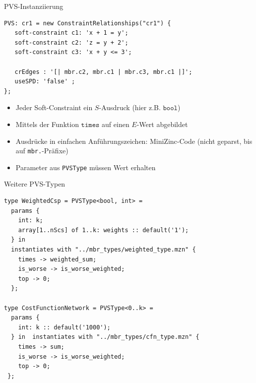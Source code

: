 \documentclass[handout,10pt,xcolor={dvipsnames},fleqn]{beamer}
\begin{document}
\begin{frame}[fragile]{PVS-Instanziierung}
\begin{lstlisting}
PVS: cr1 = new ConstraintRelationships("cr1") {
   soft-constraint c1: 'x + 1 = y';
   soft-constraint c2: 'z = y + 2';
   soft-constraint c3: 'x + y <= 3';
   
   crEdges : '[| mbr.c2, mbr.c1 | mbr.c3, mbr.c1 |]';
   useSPD: 'false' ;
}; 
\end{lstlisting}
\begin{itemize}
\item Jeder Soft-Constraint ein $S$-Ausdruck (hier z.B. $\mathtt{bool}$)
\item Mittels der Funktion $\mathtt{times}$ auf einen $E$-Wert abgebildet
\item Ausdrücke in einfachen Anführungszeichen: \alert{MiniZinc}-Code (nicht geparst, bis auf \texttt{mbr.}-Präfixe)
\item Parameter aus \texttt{PVSType} müssen Wert erhalten
\end{itemize}
\end{frame}

\begin{frame}[fragile]{Weitere PVS-Typen}
\begin{lstlisting}
type WeightedCsp = PVSType<bool, int> = 
  params {
    int: k; 
    array[1..nScs] of 1..k: weights :: default('1');
  } in  
  instantiates with "../mbr_types/weighted_type.mzn" {
    times -> weighted_sum;
    is_worse -> is_worse_weighted;
    top -> 0;
  };
  
type CostFunctionNetwork = PVSType<0..k> = 
  params {
    int: k :: default('1000'); 
  } in  instantiates with "../mbr_types/cfn_type.mzn" {
    times -> sum;
    is_worse -> is_worse_weighted; 
    top -> 0;
 };
\end{lstlisting}
\end{frame}
\end{document}
